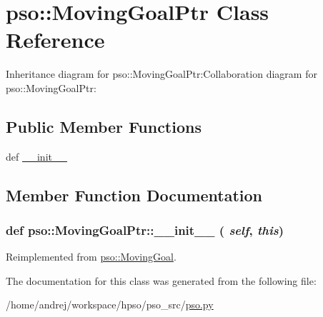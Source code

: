 \hypertarget{classpso_1_1MovingGoalPtr}{
\section{pso::MovingGoalPtr Class Reference}
\label{classpso_1_1MovingGoalPtr}
}
Inheritance diagram for pso::MovingGoalPtr:Collaboration diagram for pso::MovingGoalPtr:\subsection*{Public Member Functions}
\begin{CompactItemize}
\item 
def \hyperlink{classpso_1_1MovingGoalPtr_b48d8f3578706bbddfb9110c88acc239}{\_\-\_\-init\_\-\_\-}
\end{CompactItemize}


\subsection{Member Function Documentation}
\hypertarget{classpso_1_1MovingGoalPtr_b48d8f3578706bbddfb9110c88acc239}{
\subsubsection{\setlength{\rightskip}{0pt plus 5cm}def pso::MovingGoalPtr::\_\-\_\-init\_\-\_\- ( {\em self}, \/   {\em this})}}
\label{classpso_1_1MovingGoalPtr_b48d8f3578706bbddfb9110c88acc239}




Reimplemented from \hyperlink{classpso_1_1MovingGoal_cc887e0a1449493e7497703a3c6633f3}{pso::MovingGoal}.

The documentation for this class was generated from the following file:\begin{CompactItemize}
\item 
/home/andrej/workspace/hpso/pso\_\-src/\hyperlink{pso_8py}{pso.py}\end{CompactItemize}
